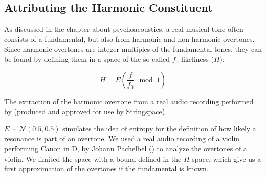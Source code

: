 \subsection{Attributing the Harmonic Constituent}
As discussed in the chapter about psychoacoustics, a real musical tone often consists of a fundamental, but also from harmonic and non-harmonic overtones. Since harmonic overtones are integer multiples of the fundamental tones, they can be found by defining them in a space of the so-called $f_0$-likeliness ($H$):

\begin{equation}
    H = E(\frac{f}{f_0} \mod{1})
\end{equation}

\begin{marginfigure}
\centering

\vspace{0.1cm}
\caption{The extraction of the harmonic overtone from a real audio recording performed by \textcite{bridget_stringspace_2019} (produced and approved for use by Stringspace).}
\label{overtonesPlot} 
\end{marginfigure}



$E \sim \mathcal{N}(0.5, 0.5)$ simulates the idea of entropy for the definition of how likely a resonance is part of an overtone.
We used a real audio recording of a violin performing Canon in D, by Johann Pachelbel (\cite{bridget_stringspace_2019}) to analyze the overtones of a violin. We limited the space with a bound defined in the $H$ space, which give us a first approximation of the overtones if the fundamental is known.